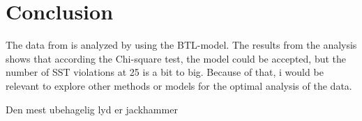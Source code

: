 \section*{Conclusion}
\label{Conclusion}
%
The data from \textcite{Ellermeier2004} is analyzed by using the BTL-model. The results from the analysis shows that according the Chi-square test, the model could be accepted, but the number of SST violations at 25 is a bit to big. Because of that, i would be relevant to explore other methods or models for the optimal analysis of the data. 


Den mest ubehagelig lyd er jackhammer 